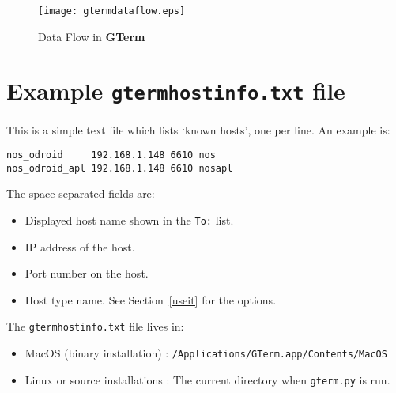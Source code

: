 \documentclass[a4paper,twoside,11pt]{article}
\newcommand{\newpara}{\par\vspace{4mm}\noindent}
\begin{document}
\begin{figure}
	\centering
		\texttt{[image: gtermdataflow.eps]}
	\caption{Data Flow in \textbf{GTerm}}
	\label{fig:dataflow}
\end{figure}

\section{Example \texttt{gtermhostinfo.txt} file}
This is a simple text file which lists `known hosts', one per line. An example is:
\begin{lstlisting}
nos_odroid     192.168.1.148 6610 nos
nos_odroid_apl 192.168.1.148 6610 nosapl
\end{lstlisting}
The space separated fields are: 
\begin{itemize}
\item  Displayed host name shown in the \texttt{To:} list.
\item IP address of the host.
\item Port number on the host.
\item Host type name. See Section~\ref{useit} for the options.
\end{itemize}

\newpara
The \texttt{gtermhostinfo.txt} file lives in:
\begin{itemize}
\item MacOS (binary installation) : \texttt{/Applications/GTerm.app/Contents/MacOS}
\item Linux or source installations : The current directory when \texttt{gterm.py} is run.
\end{itemize}
\end{document}

